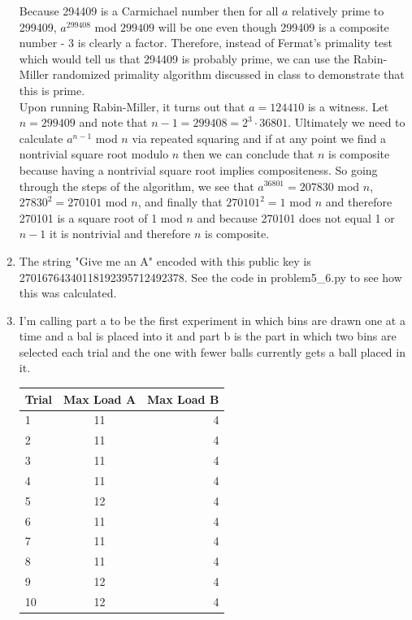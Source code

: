 \documentclass{article}
\begin{document}
\begin{enumerate}
	Because 294409 is a Carmichael number then for all $a$ relatively prime to 299409, $a^{299408}$  mod  $299409$ will be one even though 299409 is a composite number - 3 is clearly a factor.  Therefore, instead of Fermat's primality test which would tell us that 294409 is probably prime, we can use the Rabin-Miller randomized primality algorithm discussed in class to demonstrate that this is prime.  \\
	Upon running Rabin-Miller, it turns out that $a = 124410$ is a witness.  Let $n = 299409$ and note that $n - 1 = 299408 = 2 ^ 3 \cdot 36801$.  Ultimately we need to calculate $a ^ {n - 1}$ mod $n$ via repeated squaring and if at any point we find a nontrivial square root modulo $n$ then we can conclude that $n$ is composite because having a nontrivial square root implies compositeness.  So going through the steps of the algorithm, we see that $a^{36801} = 207830$ mod $n$, $27830 ^ 2 = 270101$ mod $n$, and finally that $270101 ^ 2 = 1$ mod $n$ and therefore 270101 is a square root of 1 mod $n$ and because 270101 does not equal 1 or $n - 1$ it is nontrivial and therefore $n$ is composite. 
	
	\item The string "Give me an A" encoded with this public key is 27016764340118192395712492378.  See the code in problem5\_6.py to see how this was calculated.  
	
	\item I'm calling part a to be the first experiment in which bins are drawn one at a time and a bal is placed into it and part b is the part in which two bins are selected each trial and the one with fewer balls currently gets a ball placed in it.  
	
	\begin{tabular}{l | c | r}
	Trial & Max Load A & Max Load B \\
	\hline
	1 & 11 & 4 \\
	2 & 11 & 4 \\
	3 & 11 & 4 \\ 
	4 & 11 & 4 \\
	5 & 12 & 4 \\
	6 & 11 & 4 \\
	7 & 11 & 4 \\
	8 & 11 & 4 \\
	9 & 12 & 4 \\
	10 & 12 & 4 \\	
	\end{tabular}
	

\end{enumerate}
\end{document}
